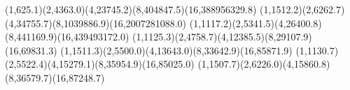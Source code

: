{(1,625.1)(2,4363.0)(4,23745.2)(8,404847.5)(16,388956329.8)}
{(1,1512.2)(2,6262.7)(4,34755.7)(8,1039886.9)(16,2007281088.0)}
{(1,1117.2)(2,5341.5)(4,26400.8)(8,441169.9)(16,439493172.0)}
{(1,1125.3)(2,4758.7)(4,12385.5)(8,29107.9)(16,69831.3)}
{(1,1511.3)(2,5500.0)(4,13643.0)(8,33642.9)(16,85871.9)}
{(1,1130.7)(2,5522.4)(4,15279.1)(8,35954.9)(16,85025.0)}
{(1,1507.7)(2,6226.0)(4,15860.8)(8,36579.7)(16,87248.7)}